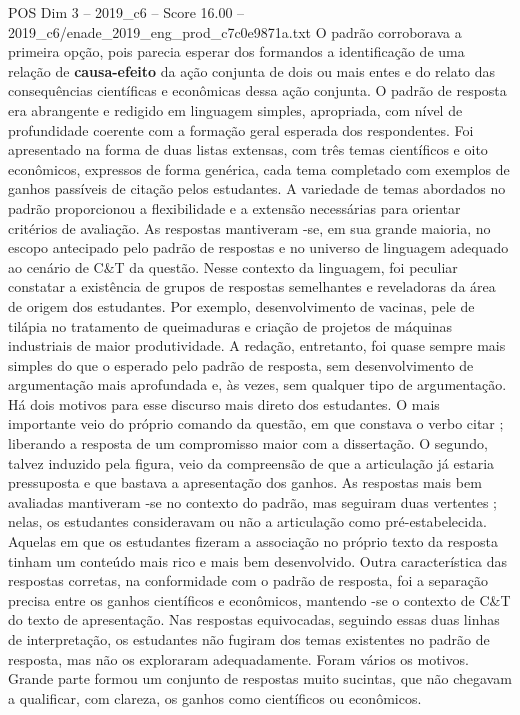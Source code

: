 \begin{textsample}{POS Dim 3 – 2019\_c6 – Score 16.00 – 2019\_c6/enade\_2019\_eng\_prod\_c7c0e9871a.txt}
O padrão corroborava a primeira opção, pois parecia esperar dos formandos a identificação de uma relação de \textbf{causa-efeito} da ação conjunta de dois ou mais entes e do relato das consequências científicas e econômicas dessa ação conjunta.
O padrão de resposta era abrangente e redigido em linguagem simples, apropriada, com nível de profundidade coerente com a formação geral esperada dos respondentes.
Foi apresentado na forma de duas listas extensas, com três temas científicos e oito econômicos, expressos de forma genérica, cada tema completado com exemplos de ganhos passíveis de citação pelos estudantes.
A variedade de temas abordados no padrão proporcionou a flexibilidade e a extensão necessárias para orientar critérios de avaliação.
As respostas mantiveram -se, em sua grande maioria, no escopo antecipado pelo padrão de respostas e no universo de linguagem adequado ao cenário de C\&T da questão.
Nesse contexto da linguagem, foi peculiar constatar a existência de grupos de respostas semelhantes e reveladoras da área de origem dos estudantes.
Por exemplo, desenvolvimento de vacinas, pele de tilápia no tratamento de queimaduras e criação de projetos de máquinas industriais de maior produtividade.
A redação, entretanto, foi quase sempre mais simples do que o esperado pelo padrão de resposta, sem desenvolvimento de argumentação mais aprofundada e, às vezes, sem qualquer tipo de argumentação.
Há dois motivos para esse discurso mais direto dos estudantes.
O mais importante veio do próprio comando da questão, em que constava o verbo citar ; liberando a resposta de um compromisso maior com a dissertação.
O segundo, talvez induzido pela figura, veio da compreensão de que a articulação já estaria pressuposta e que bastava a apresentação dos ganhos.
As respostas mais bem avaliadas mantiveram -se no contexto do padrão, mas seguiram duas vertentes ; nelas, os estudantes consideravam ou não a articulação como pré-estabelecida.
Aquelas em que os estudantes fizeram a associação no próprio texto da resposta tinham um conteúdo mais rico e mais bem desenvolvido.
Outra característica das respostas corretas, na conformidade com o padrão de resposta, foi a separação precisa entre os ganhos científicos e econômicos, mantendo -se o contexto de C\&T do texto de apresentação.
Nas respostas equivocadas, seguindo essas duas linhas de interpretação, os estudantes não fugiram dos temas existentes no padrão de resposta, mas não os exploraram adequadamente.
Foram vários os motivos.
Grande parte formou um conjunto de respostas muito sucintas, que não chegavam a qualificar, com clareza, os ganhos como científicos ou econômicos.

\end{textsample}
